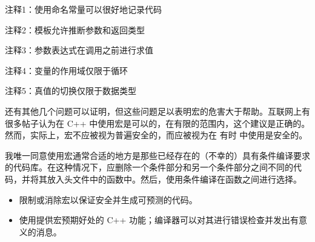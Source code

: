 {\footnotesize
注释1：使用命名常量可以很好地记录代码

注释2：模板允许推断参数和返回类型

注释3：参数表达式在调用之前进行求值

注释4：变量的作用域仅限于循环

注释5：真值的切换仅限于数据类型
}

还有其他几个问题可以证明，但这些问题足以表明宏的危害大于帮助。互联网上有很多帖子认为在 C++ 中使用宏是可以的，在有限的范围内，这个建议是正确的。然而，实际上，宏不应被视为普遍安全的，而应被视为在 有时 中使用是安全的。

我唯一同意使用宏通常合适的地方是那些已经存在的（不幸的）具有条件编译要求的代码库。在这种情况下，应删除一个条件部分和另一个条件部分之间不同的代码，并将其放入头文件中的函数中。然后，使用条件编译在函数之间进行选择。


\begin{itemize}
\item
限制或消除宏以保证安全并生成可预测的代码。

\item
使用提供宏预期好处的 C++ 功能；编译器可以对其进行错误检查并发出有意义的消息。
\end{itemize}













